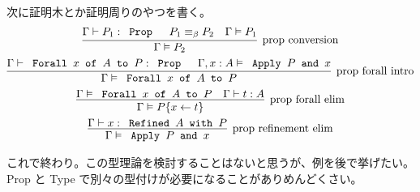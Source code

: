 次に証明木とか証明周りのやつを書く。
\begin{gather*}
  \infer[\text{prop conversion}]{\Gamma \vDash P_2}{\Gamma \vdash P_1 : \prog{Prop} & P_1 \equiv_{\beta} P_2 & \Gamma \vDash P_1} \\
  \infer[\text{prop forall intro}]{\Gamma \vDash \prog{Forall} x \prog{of} A \prog{to} P}{\Gamma \vdash \prog{Forall} x \prog{of} A \prog{to} P : \prog{Prop} & \Gamma , x : A \vDash \prog{Apply} P \prog{and} x} \\
  \infer[\text{prop forall elim}]{\Gamma \vDash P\{x \leftarrow t\}}{\Gamma \vDash \prog{Forall} x \prog{of} A \prog{to} P & \Gamma \vdash t : A} \\
  \infer[\text{prop refinement elim}]{\Gamma \vDash \prog{Apply} P \prog{and} x}{\Gamma \vdash x : \prog{Refined} A \prog{with} P}
\end{gather*}

これで終わり。この型理論を検討することはないと思うが、例を後で挙げたい。
Prop と Type で別々の型付けが必要になることがありめんどくさい。